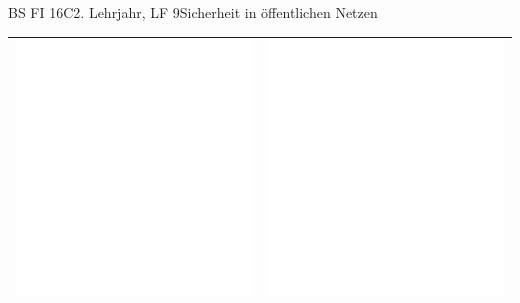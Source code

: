 \documentclass[oneside,openany,headings=optiontotoc,11pt,numbers=noenddot]{scrreprt}
\begin{document}
\begin{worksheet}{BS FI 16C}{2. Lehrjahr, LF 9}{Sicherheit in öffentlichen Netzen}
\begin{framed}
\begin{tabularx}{\textwidth}{|X|X|}
				\includegraphics[scale=0.5]{../empty.jpg} & \includegraphics[scale=0.5]{../empty.jpg} \\
				\hline
				
			\end{tabularx}
		\end{framed}
	\end{worksheet}
\end{document}
